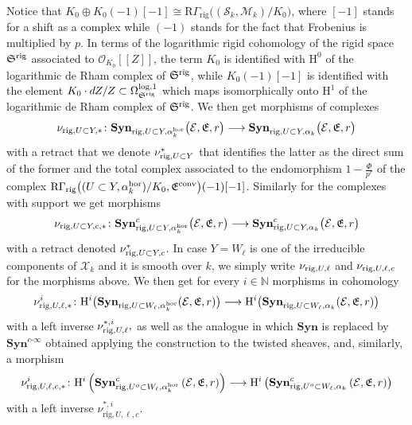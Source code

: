 \documentclass[asterisque,english]{smfart}
\begin{document}
Notice that  $K_0 \oplus K_0(-1)[-1]\cong \mathrm{R}\Gamma_{\mathrm{rig}}\bigl((\mathcal{S}_k,\mathcal{M}_k)/K_0\bigr) $, where $[-1]$ stands for a shift as a complex while $(-1)$ stands for the fact that Frobenius is multiplied by $p$. In terms of the logarithmic rigid cohomology of the rigid space $\mathfrak{S}^{\rm rig}$ associated to $\mathcal{O}_{K_0}[\![Z]\!]$, the term $K_0$ is identified with $\mathrm{H}^0$ of the logarithmic de Rham complex of $\mathfrak{S}^{\rm rig}$,  while $K_0(-1)[-1]$ is identified with the element $K_0 \cdot dZ/Z\subset \Omega^{\rm log,1}_{\mathfrak{S}^{\rm rig}}$ which maps isomorphically onto $\mathrm{H}^1$ of the logarithmic de Rham complex of $\mathfrak{S}^{\rm rig}$.
We then get morphisms of complexes
$$\nu_{{\rm rig}, U\subset Y,\ast}\colon \mathbf{Syn}_{{\rm rig},U\subset Y, \alpha_k^{\rm hor}}\bigl(\mathcal{E},\mathfrak{E},r\bigr) \longrightarrow \mathbf{Syn}_{{\rm rig},U\subset Y, \alpha_k}\bigl(\mathcal{E},\mathfrak{E},r\bigr)$$with a retract that we denote $\nu_{{\rm rig}, U\subset Y}^\ast$ that identifies the latter as the direct sum of the former and the total complex associated to the endomorphism $1-\frac{\Phi}{p^r}$ of the complex $ \mathrm{R}\Gamma_{\mathrm{rig}}\bigl((U\subset Y,\alpha_k^{\rm hor})/K_0,\mathfrak{E}^{\rm conv}\bigr)(-1)[-1]$.
Similarly for the complexes with support we get morphisms
$$\nu_{{\rm rig}, U\subset Y,c,\ast}\colon \mathbf{Syn}^c_{{\rm rig},U\subset Y, \alpha_k^{\rm hor}}\bigl(\mathcal{E},\mathfrak{E},r\bigr)\longrightarrow \mathbf{Syn}^c_{{\rm rig},U\subset Y, \alpha_k}\bigl(\mathcal{E},\mathfrak{E},r\bigr)$$with a retract denoted $\nu_{{\rm rig}, U\subset Y,c}^\ast$.
In case $Y=W_\ell$ is one of the irreducible components of $\mathcal{X}_k$ and it is smooth over $k$, we simply write $\nu_{{\rm rig},U,\ell}$ and $\nu_{{\rm rig},U,\ell,c}$ for the morphisms above. We then get for every $i\in \mathbb{N}$ morphisms in cohomology
\begin{equation} \label{eq:rhoRig}
\nu_{{\rm rig},U,\ell,\ast}^i\colon \mathrm{H}^i\bigl(\mathbf{Syn}_{{\rm rig},U\subset W_\ell, \alpha_k^{\rm hor}}(\mathcal{E},\mathfrak{E},r)\bigr) \longrightarrow\mathrm{H}^i\bigl(\mathbf{Syn}_{{\rm rig},U\subset W_\ell, \alpha_k}(\mathcal{E},\mathfrak{E},r)\bigr)
\end{equation}with a left inverse $ \nu_{{\rm rig},U,\ell}^{\ast,i},$
as well as the analogue in which $\mathbf{Syn}$ is replaced by $\mathbf{Syn}%
^{c\text{-}\infty }$ obtained applying the construction to the twisted
sheaves, and, similarly, a morphism
\begin{equation}\label{eq:rhoRigc}
\nu_{\mathrm{rig},U,\ell,c,\ast}^i\colon \mathrm{H}^{i}\left( \mathbf{Syn}_{\mathrm{rig}
,U^{o}\subset W_\ell, \alpha_k^{\rm hor}}^{c}\left( \mathcal{E},\mathfrak{E},r\right)
\right) \longrightarrow \mathrm{H}^{i}\left( \mathbf{Syn}_{\mathrm{rig}
,U^{o}\subset W_\ell, \alpha_k}^{c}\left( \mathcal{E},\mathfrak{E},r\right)
\right)
\end{equation}
with a left inverse $\nu_{\mathrm{rig},U,\ell,c}^{\ast,i}$.
\end{document}
